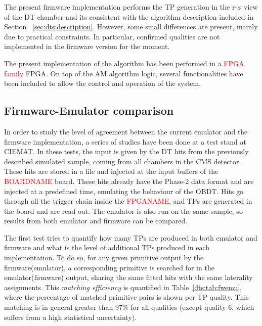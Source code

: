 \documentclass[../main.tex]{subfiles}
\begin{document}
The present firmware implementation performs the TP generation in the r-$\phi$ view of the DT chamber and its consistent with the algorithm description included in Section~ \ref{sec:dts:description}. However, some small differences are present, mainly due to practical constraints. In particular, confirmed qualities are not implemented in the firmware version for the moment. 

The present implementation of the algorithm has been performed in a \textcolor{red}{FPGA family} FPGA. On top of the AM algorithm logic, several functionalities have been included to allow the control and operation of the system.

\subsection{Firmware-Emulator comparison}

In order to study the level of agreement between the current emulator and the firmware implementation, a series of studies have been done at a test stand at CIEMAT. In these tests, the input is given by the DT hits from the previously described simulated sample, coming from all chambers in the CMS detector. These hits are stored in a file and injected at the input buffers of the \textcolor{red}{BOARDNAME} board. These hits already have the Phase-2 data format and are injected at a predefined time, emulating the behaviour of the OBDT. Hits go through all the trigger chain inside the \textcolor{red}{FPGANAME}, and TPs are generated in the board and are read out. The emulator is also run on the same sample, so results from both emulator and firmware can be compared.

The first test tries to quantify how many TPs are produced in both emulator and firmware and what is the level of additional TPs produced in each implementation. To do so, for any given primitive output by the firmware(emulator), a corresponding primitive is searched for in the emulator(firmware) output, sharing the same fitted hits with the same laterality assignments. This \textit{matching efficiency} is quantified in Table~\ref{dts:tab:fwemu}, where the percentage of matched primitive pairs is shown per TP quality. This matching is in general greater than 97\% for all qualities (except quality 6, which suffers from a high statistical uncertainty).
\end{document}
